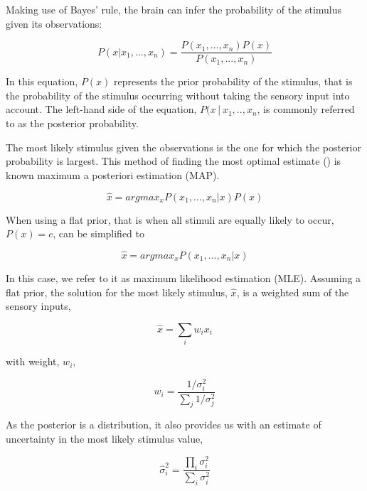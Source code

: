 Making use of Bayes' rule, the  brain can infer the probability of the stimulus given its observations:

\begin{equation}
P(x|x_1,...,x_n) = \frac{P(x_1,...,x_n)P(x)}{P(x_1,...,x_n)}
\end{equation}

In this equation, $P(x)$ represents the prior probability of the stimulus, that is the probability of the stimulus occurring without taking the sensory input into account. The left-hand side of the equation, $P(x│x_1,..,x_n$, is commonly referred to as the posterior probability.

The  most likely stimulus given the observations is  the one for which the posterior probability is largest. This method of finding the most optimal estimate () is known maximum a posteriori estimation (MAP).

\begin{equation}
\hat{x} = argmax_x P(x_1,...,x_n|x)P(x)
\label{intro:eq:map}
\end{equation}

When using a flat prior, that is when all stimuli are equally likely to occur, $P(x)=c$,  can be simplified to

\begin{equation}
\hat{x} = argmax_x P(x_1,...,x_n|x)
\label{intro:eq:mle}
\end{equation}

In this case, we refer to it as maximum  likelihood estimation (MLE). Assuming a flat prior, the solution for the  most likely stimulus, $\hat{x}$, is a weighted sum of the sensory inputs,

\begin{equation}
\hat{x}=\sum_i w_i x_i
\end{equation}

with weight, $w_i$,

\begin{equation}
w_i = \frac{1/\sigma^2_i}{\sum_j 1/\sigma^2_j}
\end{equation}

As the posterior is a distribution, it also provides us with an estimate of uncertainty in  the most likely stimulus value,

\begin{equation}
\hat{\sigma}^2_i = \frac{\prod_i \sigma^2_i}{\sum_i \sigma^2_i}
\end{equation}


